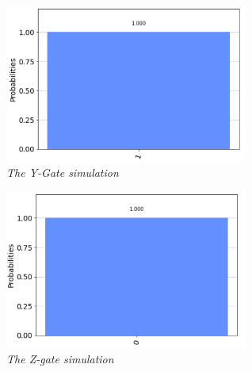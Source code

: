 \documentclass{article}
\begin{document}
\begin{figure}[h]
\begin{center}
\begin{minipage}[b]{8cm}
\centering
\includegraphics[width=8cm]{y_sym.png}\\\textit{The Y-Gate simulation}
\end{minipage}
\begin{minipage}[b]{8cm}
\centering
\includegraphics[width=8cm]{z_sym.png}\\\textit{The Z-gate simulation}
\end{minipage}
\end{center}
\end{figure}
\newpage
\end{document}
